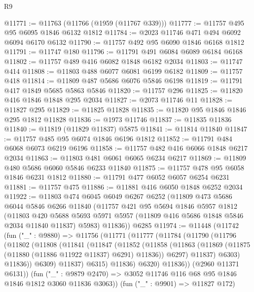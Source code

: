 \begin{lexlean}{R9}
\begin{coremodule}
@11771 := @11763 (@11766 (@1959 (@11767 @339)))
@11777 := @11757 @495 @95 @6095 @1846 @6132 @1812
@11784 := @2023 @11746 @471 @494 @6092 @6094 @6170 @6132
@11790 := @11757 @492 @95 @6090 @1846 @6168 @1812
@11791 := @11747 @180
@11796 := @11791 @491 @6084 @6089 @6184 @6168
@11802 := @11757 @489 @416 @6082 @1848 @6182 @2034
@11803 := @11747 @414
@11808 := @11803 @488 @6077 @6081 @6199 @6182
@11809 := @11757 @418
@11814 := @11809 @487 @5686 @6076 @5846 @6198
@11819 := @11791 @417 @1849 @5685 @5863 @5846
@11820 := @11757 @296
@11825 := @11820 @416 @1846 @1848 @295 @2034
@11827 := @2073 @11746 @11
@11828 := @11827 @295
@11829 := @11825 @11828
@11835 := @11820 @95 @1846 @1846 @295 @1812 @11828
@11836 := @1973 @11746
@11837 := @11835 @11836
@11840 := @11819 (@11829 @11837) @5875
@11841 := @11814 @11840
@11847 := @11757 @485 @95 @6074 @1846 @6196 @1812
@11852 := @11791 @484 @6068 @6073 @6219 @6196
@11858 := @11757 @482 @416 @6066 @1848 @6217 @2034
@11863 := @11803 @481 @6061 @6065 @6234 @6217
@11869 := @11809 @480 @5686 @6060 @5846 @6233 @11840
@11875 := @11757 @478 @95 @6058 @1846 @6231 @1812
@11880 := @11791 @477 @6052 @6057 @6254 @6231
@11881 := @11757 @475
@11886 := @11881 @416 @6050 @1848 @6252 @2034
@11922 := @11803
    @474
    @6045
    @6049
    @6267
    @6252
    (@11809
      @473
      @5686
      @6044
      @5846
      @6266
      @11840
      (@11757
        @421
        @95
        @5694
        @1846
        @5957
        @1812
        (@11803
          @420
          @5688
          @5693
          @5971
          @5957
          (@11809 @416 @5686 @1848 @5846 @2034 @11840 @11837)
          @5983)
        @11836))
    @6285
@11974 := @11448
    (@11742
      (fun ("_" : @9880) =>
      @11756
        (@11771
          (@11777
            (@11784
              (@11790
                (@11796
                  (@11802
                    (@11808
                      (@11841
                        (@11847
                          (@11852
                            (@11858
                              (@11863
                                (@11869 (@11875 (@11880 (@11886 @11922 @11837) @6291) @11836))
                                @6297)
                              @11837)
                            @6303)
                          @11836))
                      @6309)
                    @11837)
                  @6315)
                @11836)
              @6320)
            @11836))
        (@2960 @11371 @6131))
      (fun ("_" : @9879 @2470) => @3052 @11746 @116 @68 @95 @1846 @1846 @1812 @3060 @11836 @3063))
    (fun ("_" : @9901) => @11827 @172)

\end{coremodule}
\end{lexlean}
